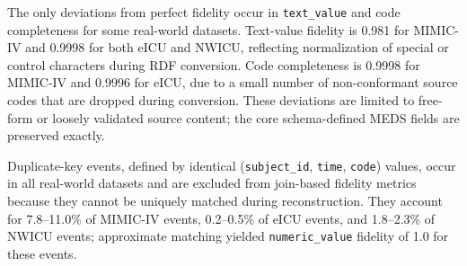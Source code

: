 The only deviations from perfect fidelity occur in \texttt{text\_value} and code completeness for some real-world datasets. Text-value fidelity is 0.981 for MIMIC-IV and 0.9998 for both eICU and NWICU, reflecting normalization of special or control characters during RDF conversion. Code completeness is 0.9998 for MIMIC-IV and 0.9996 for eICU, due to a small number of non-conformant source codes that are dropped during conversion. These deviations are limited to free-form or loosely validated source content; the core schema-defined MEDS fields are preserved exactly.

Duplicate-key events, defined by identical (\texttt{subject\_id}, \texttt{time}, \texttt{code}) values, occur in all real-world datasets and are excluded from join-based fidelity metrics because they cannot be uniquely matched during reconstruction. They account for 7.8--11.0\% of MIMIC-IV events, 0.2--0.5\% of eICU events, and 1.8--2.3\% of NWICU events; approximate matching yielded \texttt{numeric\_value} fidelity of 1.0 for these events.

